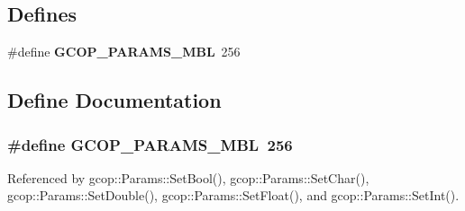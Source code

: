 \subsection*{\-Defines}
\begin{DoxyCompactItemize}
\item 
\#define {\bf \-G\-C\-O\-P\-\_\-\-P\-A\-R\-A\-M\-S\-\_\-\-M\-B\-L}~256
\end{DoxyCompactItemize}


\subsection{\-Define \-Documentation}
\subsubsection[{\-G\-C\-O\-P\-\_\-\-P\-A\-R\-A\-M\-S\-\_\-\-M\-B\-L}]{\setlength{\rightskip}{0pt plus 5cm}\#define {\bf \-G\-C\-O\-P\-\_\-\-P\-A\-R\-A\-M\-S\-\_\-\-M\-B\-L}~256}\label{params_8h_a9a8958076bcdee5268b89bc717bbedb0}


\-Referenced by gcop\-::\-Params\-::\-Set\-Bool(), gcop\-::\-Params\-::\-Set\-Char(), gcop\-::\-Params\-::\-Set\-Double(), gcop\-::\-Params\-::\-Set\-Float(), and gcop\-::\-Params\-::\-Set\-Int().

